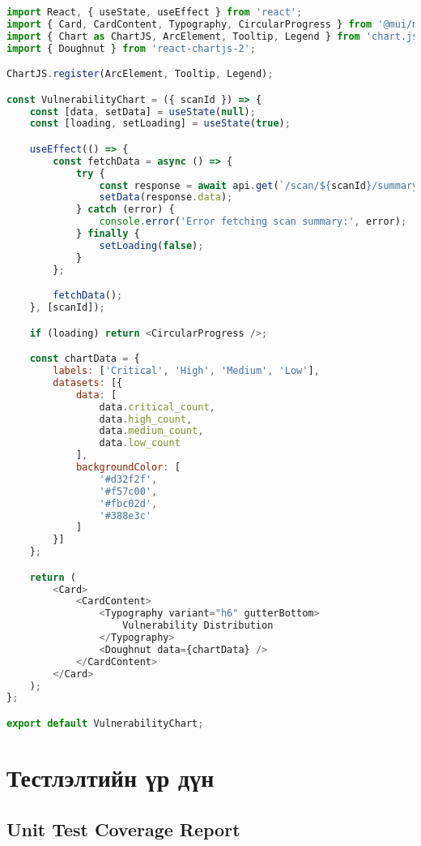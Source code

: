 \documentclass[main.tex]{subfiles}
\begin{document}
\begin{lstlisting}[language=JavaScript, caption=Vulnerability Chart компонент]
import React, { useState, useEffect } from 'react';
import { Card, CardContent, Typography, CircularProgress } from '@mui/material';
import { Chart as ChartJS, ArcElement, Tooltip, Legend } from 'chart.js';
import { Doughnut } from 'react-chartjs-2';

ChartJS.register(ArcElement, Tooltip, Legend);

const VulnerabilityChart = ({ scanId }) => {
    const [data, setData] = useState(null);
    const [loading, setLoading] = useState(true);

    useEffect(() => {
        const fetchData = async () => {
            try {
                const response = await api.get(`/scan/${scanId}/summary`);
                setData(response.data);
            } catch (error) {
                console.error('Error fetching scan summary:', error);
            } finally {
                setLoading(false);
            }
        };

        fetchData();
    }, [scanId]);

    if (loading) return <CircularProgress />;

    const chartData = {
        labels: ['Critical', 'High', 'Medium', 'Low'],
        datasets: [{
            data: [
                data.critical_count,
                data.high_count, 
                data.medium_count,
                data.low_count
            ],
            backgroundColor: [
                '#d32f2f',
                '#f57c00',
                '#fbc02d',
                '#388e3c'
            ]
        }]
    };

    return (
        <Card>
            <CardContent>
                <Typography variant="h6" gutterBottom>
                    Vulnerability Distribution
                </Typography>
                <Doughnut data={chartData} />
            </CardContent>
        </Card>
    );
};

export default VulnerabilityChart;
\end{lstlisting}

\chapter{Тестлэлтийн үр дүн}

\section{Unit Test Coverage Report}
\end{document}
